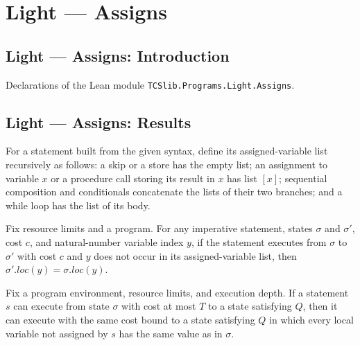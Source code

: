 \section{Light --- Assigns}
\subsection*{Light --- Assigns: Introduction}

Declarations of the Lean module \texttt{TCSlib.Programs.Light.Assigns}.

\subsection*{Light --- Assigns: Results}

\begin{definition}
\label{Light.Stmt.assigns}
\leanok
{}
For a statement built from the given syntax, define its assigned-variable list
recursively as follows: a skip or a store has the empty list; an assignment to variable
$x$ or a procedure call storing its result in $x$ has list $[x]$; sequential composition
and conditionals concatenate the lists of their two branches; and a while loop has the
list of its body.
\end{definition}

\begin{theorem}
\label{Light.Exec.loc_eq_of_notMem_assigns}
\leanok
{}
Fix resource limits and a program. For any imperative statement, states $\sigma$ and
$\sigma'$, cost $c$, and natural-number variable index $y$, if the statement executes
from $\sigma$ to $\sigma'$ with cost $c$ and $y$ does not occur in its assigned-variable
list, then $\sigma'.loc(y)=\sigma.loc(y)$.
\end{theorem}

\begin{theorem}
\label{Light.Ends.keeping}
\leanok
{}
Fix a program environment, resource limits, and execution depth. If a statement $s$ can
execute from state $\sigma$ with cost at most $T$ to a state satisfying $Q$, then it can
execute with the same cost bound to a state satisfying $Q$ in which every local variable
not assigned by $s$ has the same value as in $\sigma$.
\end{theorem}

